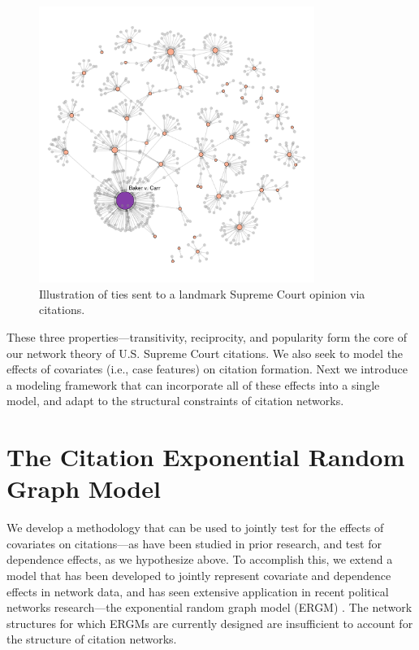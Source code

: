 \documentclass{cup-pan}
\begin{document}
\begin{figure}[bt]
\centering
\includegraphics[width = 0.8\textwidth,trim= 1cm 4cm 1cm 3cm,clip=true ]{citations_pop.pdf}
\caption{Illustration of ties sent to a landmark Supreme Court opinion via citations.}
\label{fig:popularity}
\end{figure}



These three properties---transitivity, reciprocity, and popularity form the core of our network theory of U.S. Supreme Court citations. We also seek to model the effects of covariates (i.e., case features) on citation formation.  Next we introduce a modeling framework that can incorporate all of these effects into a single model, and adapt to the structural constraints of citation networks.

 
\section{The Citation Exponential Random Graph Model}
We develop a methodology that can be used to jointly test for the effects of covariates on citations---as have been studied in prior research, and test for dependence effects, as we hypothesize above. To accomplish this, we extend a model that has been developed to jointly represent covariate and dependence effects in network data, and has seen extensive application in recent political networks research---the exponential random graph model (ERGM) \citep[e.g.,][]{box2014evolution,duque2018recognizing,osei2018elite}.  %
The network structures for which ERGMs are currently designed are insufficient to account for the structure of citation networks.
\end{document}

